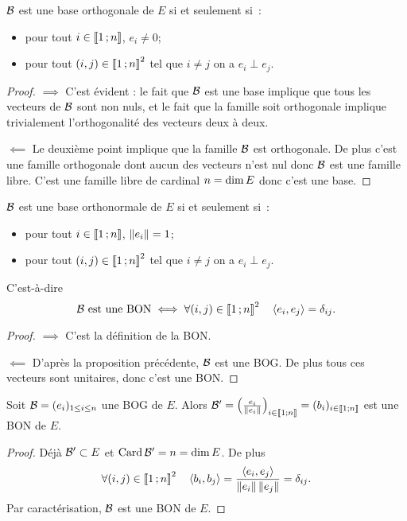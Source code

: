 \begin{prop}
  $\mathcal{B}$ est une base orthogonale de $E$ si et seulement si~:
  \begin{itemize}
  \item pour tout $i \in \mathopen{\llbracket}1\mathclose{}\mathpunct{};n\mathclose{\rrbracket}$, $e_i \neq 0$;
  \item pour tout $(i,j)\in \mathopen{\llbracket}1\mathclose{}\mathpunct{};n\mathclose{\rrbracket}^2$ tel que $i \neq j$ on a $e_i \perp e_j$.
  \end{itemize}
\end{prop}
\begin{proof}
  $\implies$ C'est évident : le fait que $\mathcal{B}$ est une base implique que tous les vecteurs de $\mathcal{B}$ sont non nuls, et le fait que la famille soit orthogonale implique trivialement l'orthogonalité des vecteurs deux à deux.

  $\impliedby$ Le deuxième point implique que la famille $\mathcal{B}$ est orthogonale. De plus c'est une famille orthogonale dont aucun des vecteurs n'est nul donc $\mathcal{B}$ est une famille libre. C'est une famille libre de cardinal $n=\operatorname{dim} E$ donc c'est une base.
\end{proof}
%
\begin{prop}
  $\mathcal{B}$ est une base orthonormale de $E$ si et seulement si~:
  \begin{itemize}
  \item pour tout $i \in \mathopen{\llbracket}1\mathclose{}\mathpunct{};n\mathclose{\rrbracket}$, $\left\lVert e_i\right\rVert=1$;
  \item pour tout $(i,j)\in \mathopen{\llbracket}1\mathclose{}\mathpunct{};n\mathclose{\rrbracket}^2$ tel que $i \neq j$ on a $e_i \perp e_j$.
  \end{itemize}
  C'est-à-dire
  \begin{equation}
    \mathcal{B} \text{~est une BON} \iff \forall (i,j)\in \mathopen{\llbracket}1\mathclose{}\mathpunct{};n\mathclose{\rrbracket}^2 \quad \left\langle{e_i},{e_j}\right\rangle=\delta_{ij}.
  \end{equation}
\end{prop}
\begin{proof}
  $\implies$ C'est la définition de la BON.

  $\impliedby$ D'après la proposition précédente, $\mathcal{B}$ est une BOG\@. De plus tous ces vecteurs sont unitaires, donc c'est une BON\@.
\end{proof}
\begin{prop}
  Soit $\mathcal{B}=(e_i)_{1 \leq i \leq n}$ une BOG de $E$. Alors $\mathcal{B}'=\left(\frac{e_i}{\left\lVert e_i\right\rVert}\right)_{i \in \mathopen{\llbracket}1\mathclose{}\mathpunct{};n\mathclose{\rrbracket}}=(b_i)_{i \in \mathopen{\llbracket}1\mathclose{}\mathpunct{};n\mathclose{\rrbracket}}$ est une BON de $E$.
\end{prop}
\begin{proof}
  Déjà $\mathcal{B}' \subset E$ et $\operatorname{Card} \mathcal{B}' = n = \operatorname{dim} E$. De plus
  \begin{equation}
    \forall (i,j) \in \mathopen{\llbracket}1\mathclose{}\mathpunct{};n\mathclose{\rrbracket}^2 \quad \left\langle{b_i},{b_j}\right\rangle=\frac{\left\langle{e_i},{e_j}\right\rangle}{\left\lVert e_i\right\rVert\left\lVert e_j\right\rVert} = \delta_{ij}.
  \end{equation}
  Par caractérisation, $\mathcal{B}$ est une BON de $E$.
\end{proof}

